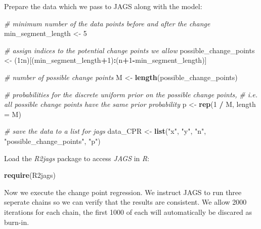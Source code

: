 \documentclass[]{article}
\newenvironment{Shaded}{\begin{snugshade}}{\end{snugshade}}
\newcommand{\KeywordTok}[1]{\textcolor[rgb]{0.13,0.29,0.53}{\textbf{#1}}}
\newcommand{\DataTypeTok}[1]{\textcolor[rgb]{0.13,0.29,0.53}{#1}}
\newcommand{\DecValTok}[1]{\textcolor[rgb]{0.00,0.00,0.81}{#1}}
\newcommand{\StringTok}[1]{\textcolor[rgb]{0.31,0.60,0.02}{#1}}
\newcommand{\CommentTok}[1]{\textcolor[rgb]{0.56,0.35,0.01}{\textit{#1}}}
\newcommand{\OperatorTok}[1]{\textcolor[rgb]{0.81,0.36,0.00}{\textbf{#1}}}
\newcommand{\NormalTok}[1]{#1}
\begin{document}
Prepare the data which we pass to JAGS along with the model:

\begin{Shaded}
\begin{Highlighting}[]
\CommentTok{# minimum number of the data points before and after the change}
\NormalTok{  min_segment_length <-}\StringTok{ }\DecValTok{5} 

\CommentTok{# assign indices to the potential change points we allow}
\NormalTok{  possible_change_points <-}\StringTok{ }\NormalTok{(}\DecValTok{1}\OperatorTok{:}\NormalTok{n)[(min_segment_length}\OperatorTok{+}\DecValTok{1}\NormalTok{)}\OperatorTok{:}\NormalTok{(n}\OperatorTok{+}\DecValTok{1}\OperatorTok{-}\NormalTok{min_segment_length)] }
 
\CommentTok{# number of possible change points}
\NormalTok{  M <-}\StringTok{ }\KeywordTok{length}\NormalTok{(possible_change_points)  }

\CommentTok{# probabilities for the discrete uniform prior on the possible change points, }
\CommentTok{# i.e. all possible change points have the same prior probability}
\NormalTok{  p <-}\StringTok{ }\KeywordTok{rep}\NormalTok{(}\DecValTok{1} \OperatorTok{/}\StringTok{ }\NormalTok{M, }\DataTypeTok{length =}\NormalTok{ M) }
 
\CommentTok{# save the data to a list for jags}
\NormalTok{  data_CPR <-}\StringTok{ }\KeywordTok{list}\NormalTok{(}\StringTok{"x"}\NormalTok{, }\StringTok{"y"}\NormalTok{, }\StringTok{"n"}\NormalTok{, }\StringTok{"possible_change_points"}\NormalTok{, }\StringTok{"p"}\NormalTok{) }
\end{Highlighting}
\end{Shaded}

Load the \emph{R2jags} package to access \emph{JAGS} in \emph{R}:

\begin{Shaded}
\begin{Highlighting}[]
  \KeywordTok{require}\NormalTok{(R2jags) }
\end{Highlighting}
\end{Shaded}

Now we execute the change point regression. We instruct JAGS to run
three seperate chains so we can verify that the results are consistent.
We allow 2000 iterations for each chain, the first 1000 of each will
automatically be discared as burn-in.
\end{document}
